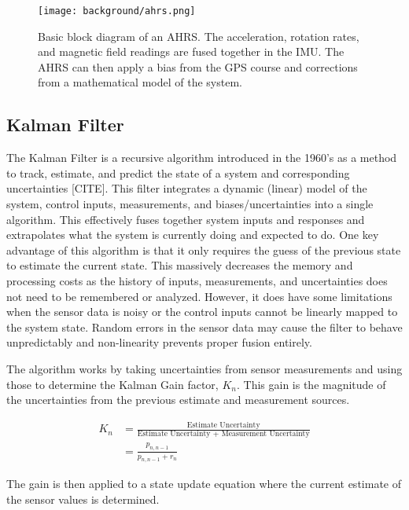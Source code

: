 \begin{figure}[h!]
    \caption[AHRS block diagram]{Basic block diagram of an AHRS. 
    The acceleration, rotation rates, and magnetic field readings are fused together in the IMU. 
    The AHRS can then apply a bias from the GPS course and corrections from a mathematical model of the system.}
    \label{fig:ahrs_design}
    \centering
    \texttt{[image: background/ahrs.png]}
\end{figure}

\subsection{Kalman Filter} \label{ssec:kalman_filter}
The Kalman Filter is a recursive algorithm introduced in the 1960's as a method to track, estimate, and predict the state of a system and corresponding uncertainties [CITE].
This filter integrates a dynamic (linear) model of the system, control inputs, measurements, and biases/uncertainties into a single algorithm.
This effectively fuses together system inputs and responses and extrapolates what the system is currently doing and expected to do.
One key advantage of this algorithm is that it only requires the guess of the previous state to estimate the current state. 
This massively decreases the memory and processing costs as the history of inputs, measurements, and uncertainties does not need to be remembered or analyzed.
However, it does have some limitations when the sensor data is noisy or the control inputs cannot be linearly mapped to the system state.
Random errors in the sensor data may cause the filter to behave unpredictably and non-linearity prevents proper fusion entirely.

The algorithm works by taking uncertainties from sensor measurements and using those to determine the Kalman Gain factor, $K_n$.
This gain is the magnitude of the uncertainties from the previous estimate and measurement sources.

\begin{equation} \label{eq:kalman_gain}
    \begin{aligned}
        K_n &= \frac{\text{Estimate Uncertainty}}{\text{Estimate Uncertainty + Measurement Uncertainty}} \\
            &= \frac{p_{n,n-1}}{p_{n,n-1} + r_n}
    \end{aligned}
\end{equation}

The gain is then applied to a state update equation where the current estimate of the sensor values is determined.

